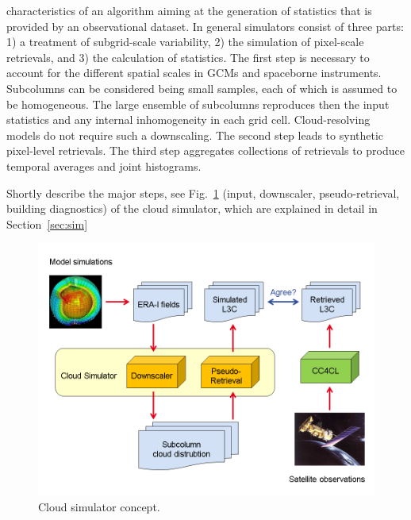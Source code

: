 characteristics of an algorithm aiming at the generation of statistics that is provided by an observational dataset.
In general simulators consist of three parts:
1) a treatment of subgrid-scale variability,
2) the simulation of pixel-scale retrievals, and
3) the calculation of statistics.
The first step is necessary to account for the different spatial scales in GCMs and spaceborne instruments.
Subcolumns can be considered being small samples, each of which is assumed to be homogeneous. 
The large ensemble of subcolumns reproduces then the input statistics and any internal inhomogeneity in each grid cell.
Cloud-resolving models do not require such a downscaling.
The second step leads to synthetic pixel-level retrievals.
The third step aggregates collections of retrievals to produce temporal averages and joint histograms.


Shortly describe the major steps, see Fig.~\ref{fig:sim_over} 
(input, downscaler, pseudo-retrieval, building diagnostics) 
of the cloud simulator, which are explained in detail in Section~\ref{sec:sim}\\

\begin{figure}[!htp]
 \includegraphics[width=\mapwidth]{./figures/simulator_overview.png}
  \caption[Concept of the cloud simulator.]
{Cloud simulator concept.}\label{fig:sim_over}
\end{figure}
